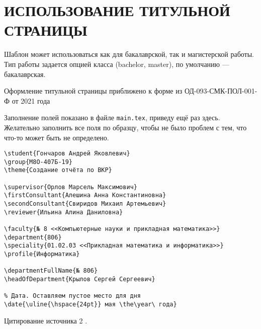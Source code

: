 \section{ИСПОЛЬЗОВАНИЕ ТИТУЛЬНОЙ СТРАНИЦЫ}

Шаблон может использоваться как для бакалаврской, так и магистерской работы.
Тип работы задается опцией класса (bachelor, master), по умолчанию --- бакалаврская.

Оформление титульной страницы приближено к форме из ОД-093-СМК-ПОЛ-001-Ф от 2021 года \cite{mai_forms}

Заполнение полей показано в файле \texttt{main.tex}, приведу ещё раз здесь. 
Желательно заполнить все поля по образцу, чтобы не было проблем с тем, 
что что-то может быть не определено.

\begingroup
\fontsize{10pt}{12pt}\selectfont
\begin{verbatim}
\student{Гончаров Андрей Яковлевич}
\group{М8О-407Б-19}
\theme{Создание отчёта по ВКР}

\supervisor{Орлов Марсель Максимович}
\firstConsultant{Алешина Анна Константиновна}
\secondConsultant{Свиридов Михаил Артемьевич}
\reviewer{Ильина Алина Даниловна}

\faculty{№ 8 <<Компьютерные науки и прикладная математика>>}
\department{806}
\speciality{01.02.03 <<Прикладная математика и информатика>>}
\profile{Информатика}

\departmentFullName{№ 806}
\headOfDepartment{Крылов Сергей Сергеевич}

% Дата. Оставляем пустое место для дня
\date{\uline{\hspace{24pt}} мая \the\year\ года}
\end{verbatim}
\endgroup

Цитирование источника 2 \cite{Wikipedia2}.